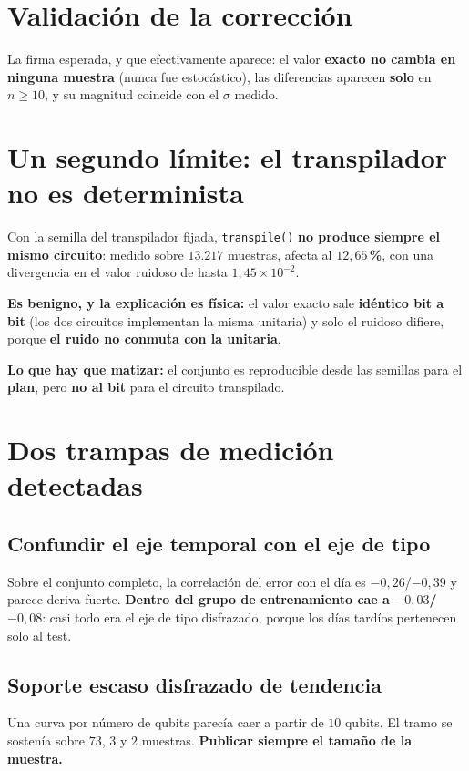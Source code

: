 \section{Validación de la corrección}
\label{sec:validacion}
La firma esperada, y que efectivamente aparece: el valor \textbf{exacto no cambia en ninguna
muestra} (nunca fue estocástico), las diferencias aparecen \textbf{solo} en $n \geq 10$, y su
magnitud coincide con el $\sigma$ medido.

\section{Un segundo límite: el transpilador no es determinista}
\label{sec:transpilador}
Con la semilla del transpilador fijada, \texttt{transpile()} \textbf{no produce siempre el
mismo circuito}: medido sobre $13.217$ muestras, afecta al \textbf{$12{,}65$\,\%}, con una
divergencia en el valor ruidoso de hasta $1{,}45\times10^{-2}$.


\textbf{Es benigno, y la explicación es física:} el valor exacto sale \textbf{idéntico bit a
bit} (los dos circuitos implementan la misma unitaria) y solo el ruidoso difiere, porque
\textbf{el ruido no conmuta con la unitaria}.

\textbf{Lo que hay que matizar:} el conjunto es reproducible desde las semillas para el
\textbf{plan}, pero \textbf{no al bit} para el circuito transpilado.

\section{Dos trampas de medición detectadas}
\label{sec:trampas}
\subsection{Confundir el eje temporal con el eje de tipo}
Sobre el conjunto completo, la correlación del error con el día es $-0{,}26$/$-0{,}39$ y
parece deriva fuerte. \textbf{Dentro del grupo de entrenamiento cae a $-0{,}03$/$-0{,}08$}:
casi todo era el eje de tipo disfrazado, porque los días tardíos pertenecen solo al test.

\subsection{Soporte escaso disfrazado de tendencia}
Una curva por número de qubits parecía caer a partir de $10$ qubits. El tramo se sostenía sobre
$73$, $3$ y $2$ muestras. \textbf{Publicar siempre el tamaño de la muestra.}
